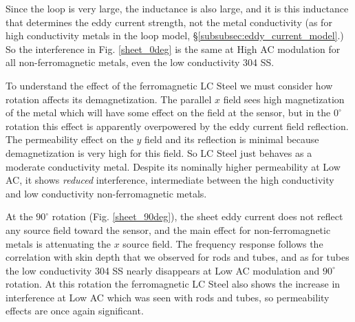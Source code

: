 \documentclass{article}
\begin{document}
Since the loop is very large, the inductance is also large, and it is this inductance that determines the eddy current strength, not the metal conductivity (as for high conductivity metals in the loop model, \S\ref{subsubsec:eddy_current_model}.) So the interference in Fig. \ref{sheet_0deg} is the same at High AC modulation for all non-ferromagnetic metals, even the low conductivity 304 SS.

To understand the effect of the ferromagnetic LC Steel we must consider how rotation affects its demagnetization. The parallel $x$ field sees high magnetization of the metal which will have some effect on the field at the sensor, but in the $0^\circ$ rotation this effect is apparently overpowered by the eddy current field reflection. The permeability effect on the $y$ field and its reflection is minimal because demagnetization is very high for this field. So LC Steel just behaves as a moderate conductivity metal. Despite its nominally higher permeability at Low AC, it shows \textit{reduced} interference, intermediate between the high conductivity and low conductivity non-ferromagnetic metals.

At the $90^\circ$ rotation (Fig. \ref{sheet_90deg}), the sheet eddy current does not reflect any source field toward the sensor, and the main effect for non-ferromagnetic metals is attenuating the $x$ source field. The frequency response follows the correlation with skin depth that we observed for rods and tubes, and as for tubes the low conductivity 304 SS nearly disappears at Low AC modulation and $90^\circ$ rotation. At this rotation the ferromagnetic LC Steel also shows the increase in interference at Low AC which was seen with rods and tubes, so permeability effects are once again significant.
\end{document}
